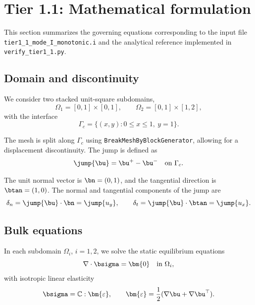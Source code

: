 \section{Tier 1.1: Mathematical formulation}
\label{sec:tier1_1}

This section summarizes the governing equations corresponding to the input file
\texttt{tier1\_1\_mode\_I\_monotonic.i} and the analytical reference implemented in
\texttt{verify\_tier1\_1.py}.

\subsection{Domain and discontinuity}

We consider two stacked unit-square subdomains,
\begin{equation}
\Omega_1 = [0,1]\times[0,1],
\qquad
\Omega_2 = [0,1]\times[1,2],
\end{equation}
with the interface
\begin{equation}
\Gamma_c = \{(x,y): 0 \le x \le 1,\ y = 1\}.
\end{equation}

The mesh is split along $\Gamma_c$ using \texttt{BreakMeshByBlockGenerator},
allowing for a displacement discontinuity. The jump is defined as
\begin{equation}
\jump{\bu} = \bu^{+} - \bu^{-} \quad \text{on } \Gamma_c.
\end{equation}

The unit normal vector is $\bn = (0,1)$, and the tangential direction is $\btan = (1,0)$.
The normal and tangential components of the jump are
\begin{equation}
\delta_n = \jump{\bu} \cdot \bn = \jump{u_y},
\qquad
\delta_t = \jump{\bu} \cdot \btan = \jump{u_x}.
\end{equation}

\subsection{Bulk equations}

In each subdomain $\Omega_i$, $i=1,2$, we solve the static equilibrium equations
\begin{equation}
\nabla \cdot \bsigma = \bm{0} \quad \text{in } \Omega_i,
\end{equation}
with isotropic linear elasticity
\begin{equation}
\bsigma = \mathbb{C} : \bm{\varepsilon},
\qquad
\bm{\varepsilon} = \frac{1}{2}(\nabla \bu + \nabla \bu^{\top}).
\end{equation}

